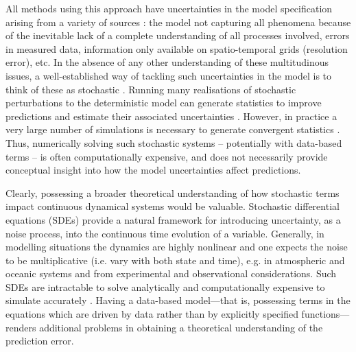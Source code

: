 All methods using this approach have uncertainties in the model specification arising from a variety of sources \cite{FangEtAl_2020_DisentanglingResolutionPrecision}: the model not capturing all phenomena because of the inevitable lack of a complete understanding of all processes involved, errors in measured data, information only available on spatio-temporal grids (resolution error), etc.  
In the absence of any other understanding of these multitudinous issues, a well-established way of tackling such uncertainties in the model is to think of these as stochastic 
\cite{BernerEtAl_2017_StochasticParameterizationNew,Oksendal_2003_StochasticDifferentialEquations}. 
Running many realisations of stochastic perturbations to the deterministic model can generate statistics to improve predictions and estimate their associated uncertainties \cite[e.g.]{BadzaEtAl_2023_HowSensitiveAre,Collins_2007_EnsemblesProbabilitiesNew}.
However, in practice a very large number of simulations is necessary to generate convergent statistics \cite{FepponLermusiaux_2018_DynamicallyOrthogonalNumerical, Leutbecher_2019_EnsembleSizeHow}.
Thus, numerically solving such stochastic systems -- potentially with data-based terms -- is often computationally expensive, and does not necessarily provide conceptual insight into how the model uncertainties affect predictions.

Clearly, possessing a broader theoretical understanding of how stochastic terms impact continuous dynamical systems would be valuable.  
Stochastic differential equations (SDEs) provide a natural framework for introducing uncertainty, as a noise process, into the continuous time evolution of a variable.
Generally, in modelling situations the dynamics are highly nonlinear and one expects the noise to be multiplicative (i.e. vary with both state and time), e.g. in atmospheric \cite{Sura_2003_StochasticAnalysisSouthern, SuraEtAl_2005_MultiplicativeNoiseNonGaussianity} and oceanic \cite{KamenkovichEtAl_2015_PropertiesOriginsAnisotropic} systems and from experimental and observational considerations.
Such SDEs are intractable to solve analytically \cite{Oksendal_2003_StochasticDifferentialEquations} and computationally expensive to simulate accurately \cite{MoraEtAl_2017_StableNumericalScheme}.
Having a data-based model---that is, possessing terms in the equations which are driven by data rather than by explicitly specified functions---renders additional problems in obtaining a theoretical understanding of the prediction error.  

